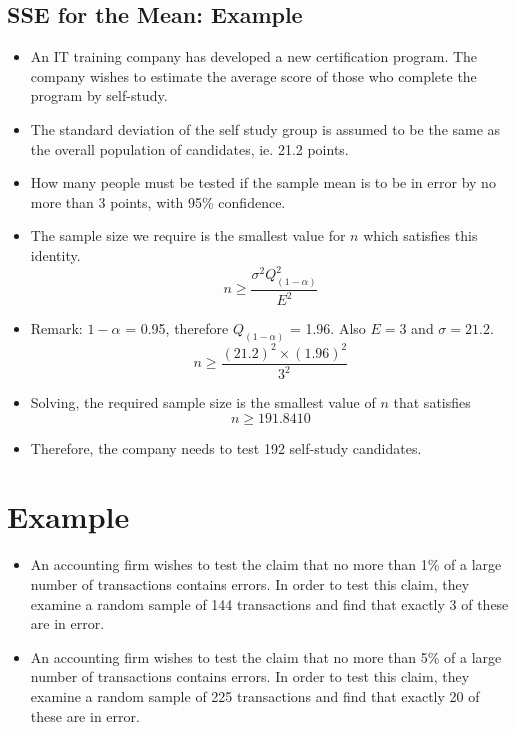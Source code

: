 \subsection{SSE for the Mean: Example}

\begin{itemize}
\item An IT training company has developed a new certification program. The company wishes to estimate the average score of those who complete the program by self-study.  \item The standard deviation of the self study group is assumed to be the same as the overall population of candidates, ie. 21.2 points.
\item How many people must be tested if the sample mean is to be in error by no more than 3 points, with 95\% confidence.
\end{itemize}





\begin{itemize}
\item The sample size we require is the smallest value for $n$ which satisfies this identity.
\[ n \geq \frac{\sigma^2 Q^2_{(1-\alpha)}}{E^2}  \]
\item Remark: $1-\alpha$ = 0.95, therefore $Q_{(1-\alpha)}$ = 1.96. Also $E=3$ and $\sigma =21.2$.
\[ n \geq \frac{(21.2)^2 \times (1.96)^2}{3^2} \]
\item Solving, the required sample size is the smallest value of $n$ that satisfies
\[ n \geq 191.8410 \]
\item Therefore, the company needs to test 192 self-study candidates.
\end{itemize}





\section{Example}
\begin{itemize}
\item An accounting firm wishes to test the claim that no more than 1\% of a large
number of transactions contains errors. In order to test this claim, they
examine a random sample of 144 transactions and find that exactly 3 of
these are in error.

\item An accounting firm wishes to test the claim that no more than 5\% of a large
number of transactions contains errors. In order to test this claim, they examine a
random sample of 225 transactions and find that exactly 20 of these are in error.
\end{itemize}








